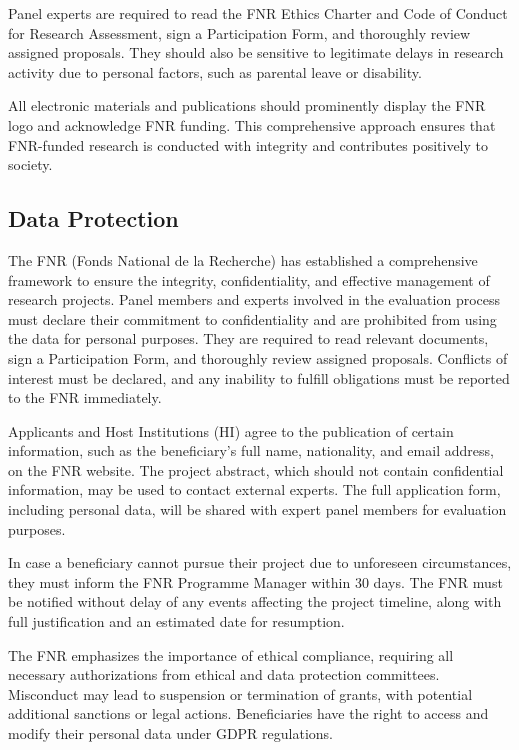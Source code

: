\documentclass{article}
\begin{document}
Panel experts are required to read the FNR Ethics Charter and Code of Conduct for Research Assessment, sign a Participation Form, and thoroughly review assigned proposals. They should also be sensitive to legitimate delays in research activity due to personal factors, such as parental leave or disability.

All electronic materials and publications should prominently display the FNR logo and acknowledge FNR funding. This comprehensive approach ensures that FNR-funded research is conducted with integrity and contributes positively to society.

\subsection{Data Protection}

The FNR (Fonds National de la Recherche) has established a comprehensive framework to ensure the integrity, confidentiality, and effective management of research projects. Panel members and experts involved in the evaluation process must declare their commitment to confidentiality and are prohibited from using the data for personal purposes. They are required to read relevant documents, sign a Participation Form, and thoroughly review assigned proposals. Conflicts of interest must be declared, and any inability to fulfill obligations must be reported to the FNR immediately.

Applicants and Host Institutions (HI) agree to the publication of certain information, such as the beneficiary's full name, nationality, and email address, on the FNR website. The project abstract, which should not contain confidential information, may be used to contact external experts. The full application form, including personal data, will be shared with expert panel members for evaluation purposes.

In case a beneficiary cannot pursue their project due to unforeseen circumstances, they must inform the FNR Programme Manager within 30 days. The FNR must be notified without delay of any events affecting the project timeline, along with full justification and an estimated date for resumption.

The FNR emphasizes the importance of ethical compliance, requiring all necessary authorizations from ethical and data protection committees. Misconduct may lead to suspension or termination of grants, with potential additional sanctions or legal actions. Beneficiaries have the right to access and modify their personal data under GDPR regulations.
\end{document}

